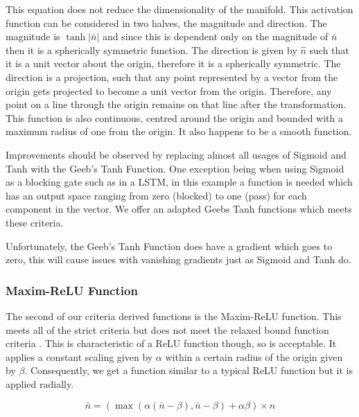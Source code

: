 \documentclass[onecolumn]{article}
\begin{document}
    This equation does not reduce the dimensionality of the manifold. This activation function can be considered in two halves, the magnitude and direction. The magnitude is $\tanh|\bar{n}|$ and since this is dependent only on the magnitude of $\bar{n}$ then it is a spherically symmetric function. The direction is given by $\hat{n}$ such that it is a unit vector about the origin, therefore it is a spherically symmetric. The direction is a projection, such that any point represented by a vector from the origin gets projected to become a unit vector from the origin. Therefore, any point on a line through the origin remains on that line after the transformation. This function is also continuous, centred around the origin and bounded with a maximum radius of one from the origin. It also happens to be a smooth function.
      
    Improvements should be observed by replacing almost all usages of Sigmoid and Tanh with the Geeb's Tanh Function. One exception being when using Sigmoid as a blocking gate such as in a LSTM, in this example a function is needed which has an output space ranging from zero (blocked) to one (pass) for each component in the vector. We offer an adapted Geebs Tanh functions which meets these criteria.
    
    Unfortunately, the Geeb's Tanh Function does have a gradient which goes to zero, this will cause issues with vanishing gradients just as Sigmoid and Tanh do.

    \subsubsection{Maxim-ReLU Function}

    The second of our criteria derived functions is the Maxim-ReLU function. This meets all of the strict criteria but does not meet the relaxed bound function criteria . This is characteristic of a ReLU function though, so is acceptable. It applies a constant scaling given by $\alpha$ within a certain radius of the origin given by $\beta$. Consequently, we get a function similar to a typical ReLU function but it is applied radially.
    
    \begin{equation}
        \label{eqn:Maxim-ReLU Function}
        \bar{n}=\left(\max\left(\alpha\left(\bar{n}-\beta\right),\bar{n}-\beta\right)+\alpha\beta\right)\times\hat{n} 
    \end{equation}
    
\end{document}

